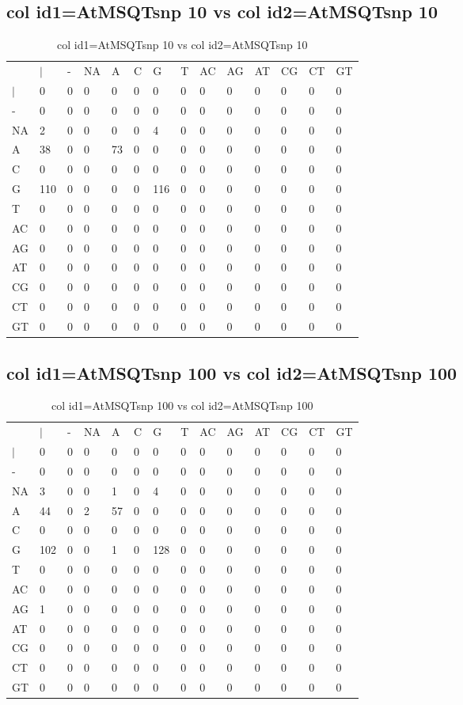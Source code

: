 \subsection{col id1=AtMSQTsnp 10 vs col id2=AtMSQTsnp 10}
\begin{center}
\begin{longtable}{|l|l|l|l|l|l|l|l|l|l|l|l|l|l|}
\caption{col id1=AtMSQTsnp 10 vs col id2=AtMSQTsnp 10} \label{table_dm688}\\
\hline
\\
\hline
&$|$&-&NA&A&C&G&T&AC&AG&AT&CG&CT&GT\\
$|$&0&0&0&0&0&0&0&0&0&0&0&0&0\\
-&0&0&0&0&0&0&0&0&0&0&0&0&0\\
NA&2&0&0&0&0&4&0&0&0&0&0&0&0\\
A&38&0&0&73&0&0&0&0&0&0&0&0&0\\
C&0&0&0&0&0&0&0&0&0&0&0&0&0\\
G&110&0&0&0&0&116&0&0&0&0&0&0&0\\
T&0&0&0&0&0&0&0&0&0&0&0&0&0\\
AC&0&0&0&0&0&0&0&0&0&0&0&0&0\\
AG&0&0&0&0&0&0&0&0&0&0&0&0&0\\
AT&0&0&0&0&0&0&0&0&0&0&0&0&0\\
CG&0&0&0&0&0&0&0&0&0&0&0&0&0\\
CT&0&0&0&0&0&0&0&0&0&0&0&0&0\\
GT&0&0&0&0&0&0&0&0&0&0&0&0&0\\
\hline
\end{longtable}
\end{center}

\subsection{col id1=AtMSQTsnp 100 vs col id2=AtMSQTsnp 100}
\begin{center}
\begin{longtable}{|l|l|l|l|l|l|l|l|l|l|l|l|l|l|}
\caption{col id1=AtMSQTsnp 100 vs col id2=AtMSQTsnp 100} \label{table_dm690}\\
\hline
\\
\hline
&$|$&-&NA&A&C&G&T&AC&AG&AT&CG&CT&GT\\
$|$&0&0&0&0&0&0&0&0&0&0&0&0&0\\
-&0&0&0&0&0&0&0&0&0&0&0&0&0\\
NA&3&0&0&1&0&4&0&0&0&0&0&0&0\\
A&44&0&2&57&0&0&0&0&0&0&0&0&0\\
C&0&0&0&0&0&0&0&0&0&0&0&0&0\\
G&102&0&0&1&0&128&0&0&0&0&0&0&0\\
T&0&0&0&0&0&0&0&0&0&0&0&0&0\\
AC&0&0&0&0&0&0&0&0&0&0&0&0&0\\
AG&1&0&0&0&0&0&0&0&0&0&0&0&0\\
AT&0&0&0&0&0&0&0&0&0&0&0&0&0\\
CG&0&0&0&0&0&0&0&0&0&0&0&0&0\\
CT&0&0&0&0&0&0&0&0&0&0&0&0&0\\
GT&0&0&0&0&0&0&0&0&0&0&0&0&0\\
\hline
\end{longtable}
\end{center}

